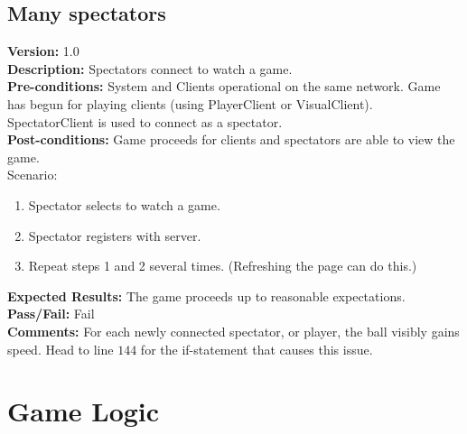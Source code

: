 \documentclass[12pt]{article}
\begin{document}
    \subsection{Many spectators}
    \label{sec:manySpectators}
    \textbf{Version:} 1.0\\
    \textbf{Description:} Spectators connect to watch a game.\\
    \textbf{Pre-conditions:} System and Clients operational on the same network.  Game has begun for playing clients (using PlayerClient or VisualClient).  SpectatorClient is used to connect as a spectator.\\
    \textbf{Post-conditions:} Game proceeds for clients and spectators are able to view the game.\\
    Scenario:
    \begin{enumerate}
        \item Spectator selects to watch a game.
        \item Spectator registers with server.
        \item Repeat steps 1 and 2 several times. (Refreshing the page can do this.)
    \end{enumerate}
    \textbf{Expected Results:} The game proceeds up to reasonable expectations.\\
    \textbf{Pass/Fail:} Fail\\
    \textbf{Comments:} For each newly connected spectator, or player, the ball visibly gains speed.  Head to line $144$ for the if-statement that causes this issue.\\

\newpage

\section{Game Logic}
\label{sec:logicCases}
\end{document}
